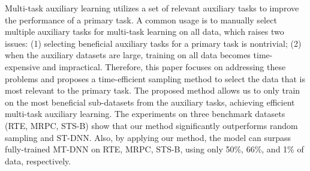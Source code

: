 Multi-task auxiliary learning utilizes a set of relevant auxiliary tasks to improve the performance of a primary task. A common usage is to manually select multiple auxiliary tasks for multi-task learning on all data, which raises two issues: (1) selecting beneficial auxiliary tasks for a primary task is nontrivial; (2) when the auxiliary datasets are large, training on all data becomes time-expensive and impractical. Therefore, this paper focuses on addressing these problems and proposes a time-efficient sampling method to select the data that is most relevant to the primary task. The proposed method allows us to only train on the most beneficial sub-datasets from the auxiliary tasks, achieving efficient multi-task auxiliary learning. The experiments on three benchmark datasets (RTE, MRPC, STS-B) show that our method significantly outperforms random sampling and ST-DNN. Also, by applying our method, the model can surpass fully-trained MT-DNN on RTE, MRPC, STS-B, using only 50\%, 66\%, and 1\% of data, respectively.
